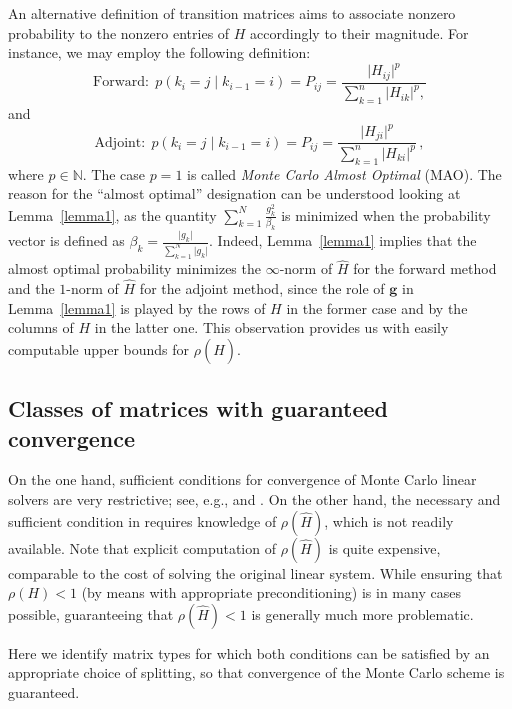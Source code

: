 \documentclass[final,leqno,onefignum,onetabnum]{siamltex1213}
\begin{document}
An alternative definition of transition matrices aims to associate nonzero 
probability to the nonzero entries of $H$ accordingly to their magnitude. For 
instance, we may employ the following definition:
\[
\text{Forward}: \;
p(k_i=j \;\lvert\;k_{i-1}=i )=P_{ij}=\frac{\lvert
H_{ij}\rvert^p}{\sum_{k=1}^n
\lvert H_{ik}\rvert^p,}
\]
and
\[
\text{Adjoint}: \;
p(k_i=j \;\lvert\;k_{i-1}=i )=P_{ij}=\frac{\lvert
H_{ji}\rvert^p}{\sum_{k=1}^n
\lvert H_{ki}\rvert^p} \,,
\]
where $p\in \mathbb{N}$.
The case $p=1$ is called
\textit{Monte Carlo Almost Optimal} (MAO).
The reason for the ``almost optimal'' designation can be understood looking 
at
Lemma~\ref{lemma1}, as the quantity
$\sum_{k=1}^N\frac{g_k^2}{\beta_k}$
is minimized when the probability vector is
defined as $\displaystyle \beta_k=\frac{\lvert 
g_k\rvert}{\sum_{k=1}^N \lvert
g_k\rvert}$. Indeed, Lemma~\ref{lemma1} implies that the almost optimal probability 
minimizes the
$\infty$-norm of $\hat{H}$ for the forward method and the $1$-norm of $\hat{H}$
for the adjoint method, since the role of $\mathbf{g}$ in Lemma~\ref{lemma1} is played 
by the rows of $H$ in the former case and by the columns of $H$ in the latter one. 
This observation provides us with easily computable upper bounds for 
$\rho(\hat{H})$.

\subsection{Classes of matrices with guaranteed convergence}

On the one hand, sufficient conditions for
convergence of Monte Carlo linear solvers are very restrictive; see, e.g.,
\cite{Srin2010} and \cite{MASC2013}. On the other hand, the necessary and 
sufficient 
condition in \cite{MASC2013} requires knowledge of $\rho(\hat{H})$, which 
is not readily available. Note that explicit computation of $\rho(\hat{H})$
is quite expensive, comparable to the cost of solving the original linear system.
While ensuring that $\rho(H)<1$ (by means with appropriate preconditioning)
is in many cases possible, guaranteeing that $\rho(\hat{H})<1$ is generally
much more problematic.

Here we identify matrix types for which both conditions can be satisfied
by an appropriate choice of splitting, so that convergence of the Monte Carlo scheme
is guaranteed.

\end{document}
